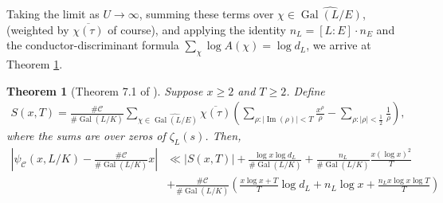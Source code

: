 \documentclass[12pt]{amsart}
\newtheorem{thm}{Theorem}[section]
\theoremstyle{definition}
\theoremstyle{remark}
\numberwithin{equation}{section}
\newcommand{\cC}{\mathcal C}
\DeclareMathOperator{\im}{Im}
\DeclareMathOperator{\Gal}{Gal}
\begin{document}
Taking the limit as $U \to \infty$, summing these terms over $\chi \in \widehat{\Gal(L/E)}$, (weighted by $\overline{\chi(\tau)}$ of course), and applying the identity $n_{L} = [L:E]\cdot n_{E}$ and the conductor-discriminant formula $\sum_{\chi} \log A(\chi) = \log d_{L}$, we arrive at Theorem \ref{thm:BoundWithSxT}.
\begin{thm}[Theorem 7.1 of \cite{LagariasOdlyzko77}] \label{thm:BoundWithSxT}
Suppose $x \geq 2$ and $T \geq 2$. Define
\begin{align}
S(x,T) = \frac{\# \cC}{\#\Gal(L/K)} \sum_{\chi \in \widehat{\Gal(L/E)}} \overline{\chi(\tau)} \left( \sum_{\rho: |\im(\rho)| < T} \frac{x^{\rho}}{\rho} - \sum_{\rho: |\rho| < \frac{1}{2}} \frac{1}{\rho}\right),
\end{align}
where the sums are over zeros of $\zeta_{L}(s)$. Then,
\begin{align} \label{eqn:MessyApproximationForPsiC}
 \left|\psi_{\cC}(x, L/K) - \frac{\# \cC}{\#\Gal(L/K)} x\right| & \ll  |S(x,T)| +  \frac{\log x \log d_{L}}{\# \Gal(L/K)} + \frac{n_{L}}{\#\Gal(L/K)}\frac{x (\log x)^2}{T}
 \nonumber \\
  & +  \frac{\# \cC}{\# \Gal(L/K)} \left( \frac{x \log x  + T}{T} \log d_{L} + n_{L} \log x + \frac{n_{L} x \log x \log T}{T}\right)
\end{align}
\end{thm}
\end{document}
